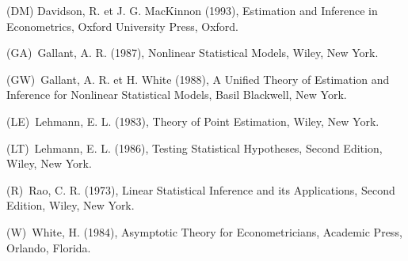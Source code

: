 \documentclass[titlepage,11pt,amstex]{article}
\begin{document}
(DM) Davidson, R. et J. G. MacKinnon (1993), Estimation and Inference in
Econometrics, Oxford University Press, Oxford.

(GA)\ Gallant, A. R. (1987), Nonlinear Statistical Models, Wiley, New York.

(GW)\ Gallant, A. R. et H. White (1988), A Unified Theory of Estimation and
Inference for Nonlinear Statistical Models, Basil Blackwell, New York.

(LE)\ Lehmann, E. L. (1983), Theory of Point Estimation, Wiley, New York.

(LT)\ Lehmann, E. L. (1986), Testing Statistical Hypotheses, Second Edition,
Wiley, New York.

(R)\ Rao, C. R. (1973), Linear Statistical Inference and its Applications,
Second Edition, Wiley, New York.

(W)\ White, H. (1984), Asymptotic Theory for Econometricians, Academic
Press, Orlando, Florida.

\newpage
\end{document}
